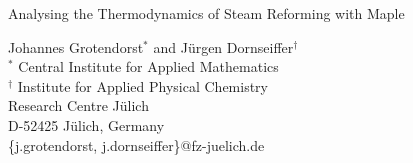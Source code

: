 \documentclass[12pt]{article}
\begin{document}

\Large
{
\begin{center}
Analysing the Thermodynamics of Steam Reforming with Maple
\end{center}
}

{\small
\begin{center} Johannes Grotendorst${}^*$ and J\"urgen Dornseiffer${}^\dag$ \\
\medskip
${}^*$ Central Institute for Applied Mathematics\\
${}^\dag$ Institute for Applied Physical Chemistry\\
Research Centre J\"ulich\\  D-52425 J\"ulich, Germany\\
\{j.grotendorst, j.dornseiffer\}@fz-juelich.de
\end{center}
}
\end{document}
